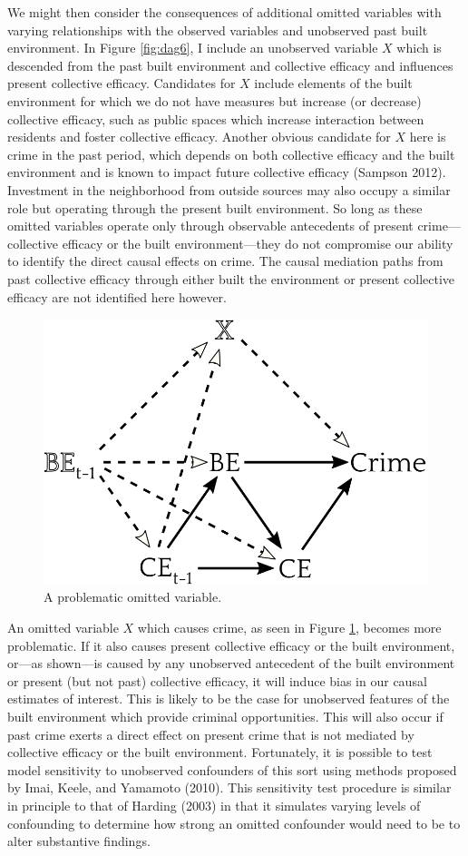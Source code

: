 \documentclass [11pt, proquest] {uwthesis}[2015/03/03]
\begin{document}
We might then consider the consequences of additional omitted variables with varying relationships with the observed variables and unobserved past built environment. In Figure \ref{fig:dag6}, I include an unobserved variable \(X\) which is descended from the past built environment and collective efficacy and influences present collective efficacy. Candidates for \(X\) include elements of the built environment for which we do not have measures but increase (or decrease) collective efficacy, such as public spaces which increase interaction between residents and foster collective efficacy. Another obvious candidate for \(X\) here is crime in the past period, which depends on both collective efficacy and the built environment and is known to impact future collective efficacy (Sampson 2012). Investment in the neighborhood from outside sources may also occupy a similar role but operating through the present built environment. So long as these omitted variables operate only through observable antecedents of present crime---collective efficacy or the built environment---they do not compromise our ability to identify the direct causal effects on crime. The causal mediation paths from past collective efficacy through either built the environment or present collective efficacy are not identified here however.\linebreak
\linebreak
\begin{figure}

{\centering \includegraphics[width=0.6\linewidth]{./figure/appendix/7_backdoor_path} 

}

\caption{A problematic omitted variable.}\label{fig:dag7}
\end{figure}
An omitted variable \(X\) which causes crime, as seen in Figure \ref{fig:dag7}, becomes more problematic. If it also causes present collective efficacy or the built environment, or---as shown---is caused by any unobserved antecedent of the built environment or present (but not past) collective efficacy, it will induce bias in our causal estimates of interest. This is likely to be the case for unobserved features of the built environment which provide criminal opportunities. This will also occur if past crime exerts a direct effect on present crime that is not mediated by collective efficacy or the built environment. Fortunately, it is possible to test model sensitivity to unobserved confounders of this sort using methods proposed by Imai, Keele, and Yamamoto (2010). This sensitivity test procedure is similar in principle to that of Harding (2003) in that it simulates varying levels of confounding to determine how strong an omitted confounder would need to be to alter substantive findings.
\end{document}
